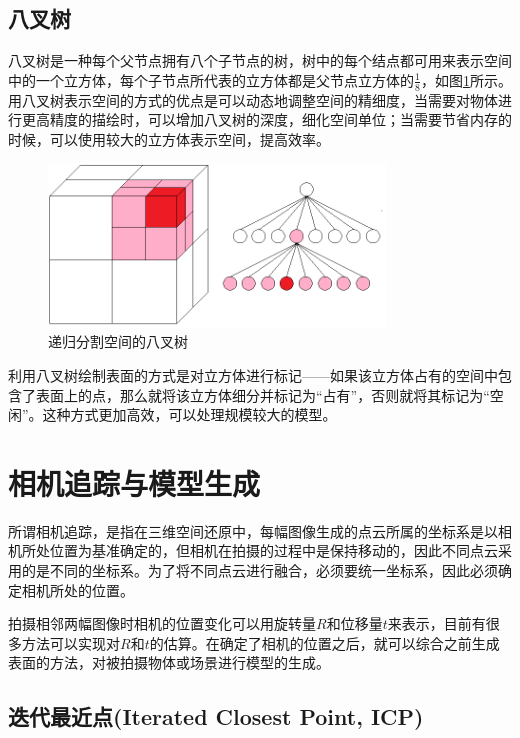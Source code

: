 \documentclass{llncs}
\begin{document}
\begin{CJK}{UTF8}{song}

	\subsection{八叉树}
八叉树是一种每个父节点拥有八个子节点的树\cite{Wurm2010OctoMap}，树中的每个结点都可用来表示空间中的一个立方体，每个子节点所代表的立方体都是父节点立方体的$\frac{1}{8}$，如图\ref{Octree}所示。用八叉树表示空间的方式的优点是可以动态地调整空间的精细度，当需要对物体进行更高精度的描绘时，可以增加八叉树的深度，细化空间单位；当需要节省内存的时候，可以使用较大的立方体表示空间，提高效率。

\begin{figure}
\centering
\includegraphics[width=0.8\textwidth]{picts/octree.png}
\caption{递归分割空间的八叉树}
\label{Octree}
\end{figure}

利用八叉树绘制表面的方式是对立方体进行标记——如果该立方体占有的空间中包含了表面上的点，那么就将该立方体细分并标记为“占有”，否则就将其标记为“空闲”。这种方式更加高效，可以处理规模较大的模型。


\section{相机追踪与模型生成}

所谓相机追踪，是指在三维空间还原中，每幅图像生成的点云所属的坐标系是以相机所处位置为基准确定的，但相机在拍摄的过程中是保持移动的，因此不同点云采用的是不同的坐标系。为了将不同点云进行融合，必须要统一坐标系，因此必须确定相机所处的位置。

拍摄相邻两幅图像时相机的位置变化可以用旋转量$R$和位移量$t$来表示，目前有很多方法可以实现对$R$和$t$的估算。在确定了相机的位置之后，就可以综合之前生成表面的方法，对被拍摄物体或场景进行模型的生成。

	\subsection{迭代最近点(Iterated Closest Point, ICP)}


\end{CJK}
\end{document}
